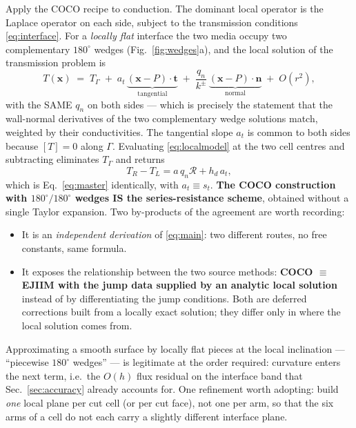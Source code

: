 \documentclass[11pt,a4paper]{article}
\newcommand{\jump}[1]{\left[#1\right]}
\newcommand{\nn}{\boldsymbol{n}}
\newcommand{\Rser}{\mathcal{R}}
\begin{document}
Apply the COCO recipe to conduction. The dominant local operator is the Laplace
operator on each side, subject to the transmission conditions
\eqref{eq:interface}. For a \emph{locally flat} interface the two media occupy
two complementary $180^\circ$ wedges (Fig.~\ref{fig:wedges}a), and the local
solution of the transmission problem is
\begin{equation}
  T(\boldsymbol{x}) \;=\; T_\Gamma
    \;+\; a_t\,\underbrace{(\boldsymbol{x}\!-\!P)\cdot\boldsymbol{t}}_{\text{tangential}}
    \;+\; \frac{q_n}{k^{\pm}}\,
          \underbrace{(\boldsymbol{x}\!-\!P)\cdot\nn}_{\text{normal}}
    \;+\;O(r^{2}),
  \label{eq:localmodel}
\end{equation}
with the SAME $q_n$ on both sides --- which is precisely the statement that the
wall-normal derivatives of the two complementary wedge solutions match, weighted
by their conductivities. The tangential slope $a_t$ is common to both sides
because $\jump{T}=0$ along $\Gamma$. Evaluating \eqref{eq:localmodel} at the two
cell centres and subtracting eliminates $T_\Gamma$ and returns
\begin{equation}
  T_R-T_L = a\,q_n\Rser + h_d\,a_t ,
\end{equation}
which is Eq.~\eqref{eq:master} identically, with $a_t\equiv s_t$. \textbf{The
COCO construction with $180^\circ/180^\circ$ wedges IS the series-resistance
scheme}, obtained without a single Taylor expansion. Two by-products of the
agreement are worth recording:
\begin{itemize}
\item It is an \emph{independent derivation} of \eqref{eq:main}: two different
      routes, no free constants, same formula.
\item It exposes the relationship between the two source methods:
      \textbf{COCO $\equiv$ EJIIM with the jump data supplied by an analytic
      local solution} instead of by differentiating the jump conditions. Both
      are deferred corrections built from a locally exact solution; they differ
      only in where the local solution comes from.
\end{itemize}
Approximating a smooth surface by locally flat pieces at the local inclination
--- ``piecewise $180^\circ$ wedges'' --- is legitimate at the order required:
curvature enters the next term, i.e.\ the $O(h)$ flux residual on the interface
band that Sec.~\ref{sec:accuracy} already accounts for. One refinement worth
adopting: build \emph{one} local plane per cut cell (or per cut face), not one
per arm, so that the six arms of a cell do not each carry a slightly different
interface plane.
\end{document}
